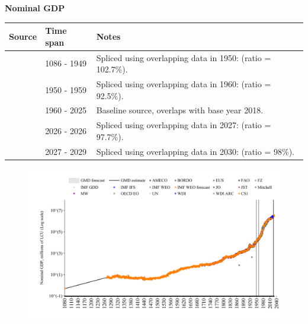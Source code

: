 \documentclass[12pt,a4paper,landscape]{article}
\begin{document}
\begin{adjustbox}{max totalsize={\paperwidth}{\paperheight},center}
\begin{minipage}[t][\textheight][t]{\textwidth}
\vspace*{0.5cm}
{}
\begin{center}
{\Large\bfseries Nominal GDP}
\end{center}
\vspace{0.5cm}
\begin{table}[H]
\centering
\small
\begin{tabular}{|l|l|l|}
\hline
\textbf{Source} & \textbf{Time span} & \textbf{Notes} \\
\hline
\rowcolor{white}\cite{CS1_GBR}& 1086 - 1949 &Spliced using overlapping data in 1950: (ratio = 102.7\%). \\
\rowcolor{lightgray}\cite{IMF_GDD}& 1950 - 1959 &Spliced using overlapping data in 1960: (ratio = 92.5\%). \\
\rowcolor{white}\cite{OECD_EO}& 1960 - 2025 &Baseline source, overlaps with base year 2018. \\
\rowcolor{lightgray}\cite{AMECO}& 2026 - 2026 &Spliced using overlapping data in 2027: (ratio = 97.7\%). \\
\rowcolor{white}\cite{IMF_WEO_forecast}& 2027 - 2029 &Spliced using overlapping data in 2030: (ratio = 98\%). \\
\hline
\end{tabular}
\end{table}
\begin{figure}[H]
\centering
\includegraphics[width=\textwidth,height=0.6\textheight,keepaspectratio]{graphs/GBR_nGDP.pdf}
\end{figure}
\end{minipage}
\end{adjustbox}
\end{document}
